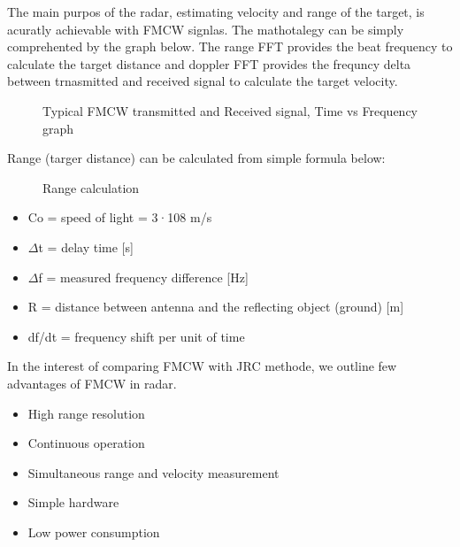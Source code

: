 \documentclass[conference]{IEEEtran}
\begin{document}
\begin{enumerate}
The main purpos of the radar, estimating velocity and range of the target, is acuratly achievable with FMCW signlas. The mathotalegy can be simply comprehented by the graph below. The range FFT provides the beat frequency to calculate the target distance and doppler FFT provides the frequncy delta between trnasmitted and received signal to calculate the target velocity. 
	
	\begin{figure}[H]
    		\centering
    		\caption{Typical FMCW transmitted and Received signal, Time vs Frequency graph \cite{Long2019AssistingTV}}
	\end{figure}
	
	Range (targer distance) can be calculated from simple formula below:
	
	\begin{figure}[H]
    		\centering
    		\caption{Range calculation}
	\end{figure}
	
	\begin{itemize}
	\item Co = speed of light = 3·108 m/s
	\item \(\Delta \)t = delay time [s]
	\item \(\Delta \)f = measured frequency difference [Hz]
	\item R = distance between antenna and the reflecting object (ground) [m]
	\item df/dt = frequency shift per unit of time
	\end{itemize}

In the interest of comparing FMCW with JRC methode, we outline few advantages of FMCW in radar.
	\begin{itemize}
		\item High range resolution
		\item Continuous operation
		\item Simultaneous range and velocity measurement
		\item Simple hardware
		\item Low power consumption
	\end{itemize}
	

\end{enumerate}
\end{document}
